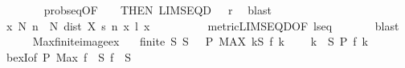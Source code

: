 \begin{isabellebody}
\ \ \ \ \ \ \isamarkupfalse%
\ prob{\isacharunderscore}{\kern0pt}seq{\isacharbrackleft}{\kern0pt}OF\ {\isacartoucheopen}{}\ {\isacharless}{\kern0pt}\ {\isasymepsilon}{\isacharslash}{\kern0pt}{}{\isacartoucheclose}{\isacharcomma}{\kern0pt}\ THEN\ LIMSEQ{\isacharunderscore}{\kern0pt}D{\isacharbrackright}{\kern0pt}\ {\isacartoucheopen}{}\ {\isacharless}{\kern0pt}\ r{\isacartoucheclose}\ \isamarkupfalse%
\ blast\isanewline
\ \ \ \ \isamarkupfalse%
\ {\isachardoublequoteopen}{\isasymforall}x{\isachardot}{\kern0pt}\ {\isasymexists}N{\isacharprime}{\kern0pt}{\isachardot}{\kern0pt}\ {\isasymforall}n\ {\isasymge}\ N{\isacharprime}{\kern0pt}{\isachardot}{\kern0pt}\ dist\ {\isacharparenleft}{\kern0pt}X\ {\isacharparenleft}{\kern0pt}s\ n{\isacharparenright}{\kern0pt}\ x{\isacharparenright}{\kern0pt}\ {\isacharparenleft}{\kern0pt}l\ x{\isacharparenright}{\kern0pt}\ {\isacharless}{\kern0pt}\ {\isasymepsilon}{\isacharslash}{\kern0pt}{}{\isachardoublequoteclose}\isanewline
\ \ \ \ \ \ \isamarkupfalse%
\ metric{\isacharunderscore}{\kern0pt}LIMSEQ{\isacharunderscore}{\kern0pt}D{\isacharbrackleft}{\kern0pt}OF\ l{\isacharunderscore}{\kern0pt}seq\ {\isacartoucheopen}{\isasymepsilon}\ {\isacharslash}{\kern0pt}\ {}\ {\isachargreater}{\kern0pt}\ {}{\isacartoucheclose}{\isacharbrackright}{\kern0pt}\ \isamarkupfalse%
\ blast\isanewline
\ \ \ \ \isamarkupfalse%
%
\endisatagproof
{\isafoldproof}%
%
\isadelimproof
\isanewline
%
\endisadelimproof
\isanewline
{}\isamarkupfalse%
\ Max{\isacharunderscore}{\kern0pt}finite{\isacharunderscore}{\kern0pt}image{\isacharunderscore}{\kern0pt}ex{\isacharcolon}{\kern0pt}\isanewline
\ \ \ {\isachardoublequoteopen}finite\ S{\isachardoublequoteclose}\ {\isachardoublequoteopen}S\ {\isasymnoteq}\ {\isacharbraceleft}{\kern0pt}{\isacharbraceright}{\kern0pt}{\isachardoublequoteclose}\ {\isachardoublequoteopen}P\ {\isacharparenleft}{\kern0pt}MAX\ k{\isasymin}S{\isachardot}{\kern0pt}\ f\ k{\isacharparenright}{\kern0pt}{\isachardoublequoteclose}\ \isanewline
\ \ \ {\isachardoublequoteopen}{\isasymexists}k\ {\isasymin}\ S{\isachardot}{\kern0pt}\ P\ {\isacharparenleft}{\kern0pt}f\ k{\isacharparenright}{\kern0pt}{\isachardoublequoteclose}\isanewline
%
\isadelimproof
\ \ %
\endisadelimproof
%
\isatagproof
{}\isamarkupfalse%
\ bexI{\isacharbrackleft}{\kern0pt}of\ P\ {\isachardoublequoteopen}Max\ {\isacharparenleft}{\kern0pt}f\ {\isacharbackquote}{\kern0pt}\ S{\isacharparenright}{\kern0pt}{\isachardoublequoteclose}\ {\isachardoublequoteopen}f\ {\isacharbackquote}{\kern0pt}\ S{\isachardoublequoteclose}{\isacharbrackright}{\kern0pt}\ \isamarkupfalse%

\end{isabellebody}
